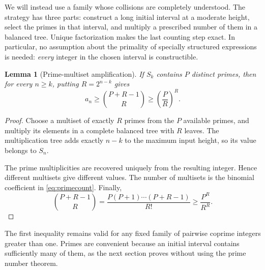 \documentclass[11pt,a4paper]{article}
\newtheorem{lemma}[theorem]{Lemma}
\theoremstyle{definition}
\theoremstyle{remark}
\begin{document}
We will instead use a family whose collisions are completely understood.
The strategy has three parts: construct a long initial interval at a
moderate height, select the primes in that interval, and multiply a
prescribed number of them in a balanced tree. Unique factorization makes
the last counting step exact. In particular, no assumption about the
primality of specially structured expressions is needed: \emph{every}
integer in the chosen interval is constructible.

\begin{lemma}[Prime-multiset amplification]\label{lem:amplify}
If $S_k$ contains $P$ distinct primes, then for every $n\ge k$, putting
$R=2^{n-k}$ gives
\begin{equation}\label{eq:primecount}
 a_n\ge\binom{P+R-1}{R}\ge\left(\frac{P}{R}\right)^R.
\end{equation}
\end{lemma}
\begin{proof}
Choose a multiset of exactly $R$ primes from the $P$ available primes,
and multiply its elements in a complete balanced tree with $R$ leaves.
The multiplication tree adds exactly $n-k$ to the maximum input height,
so its value belongs to $S_n$.

The prime multiplicities are recovered uniquely from the resulting
integer. Hence different multisets give different values. The number of
multisets is the binomial coefficient in \eqref{eq:primecount}. Finally,
\[
 \binom{P+R-1}{R}
 =\frac{P(P+1)\cdots(P+R-1)}{R!}
 \ge\frac{P^R}{R^R}.
\]
\end{proof}

The first inequality remains valid for any fixed family of pairwise
coprime integers greater than one. Primes are convenient because an
initial interval contains sufficiently many of them, as the next section
proves without using the prime number theorem.
\end{document}
